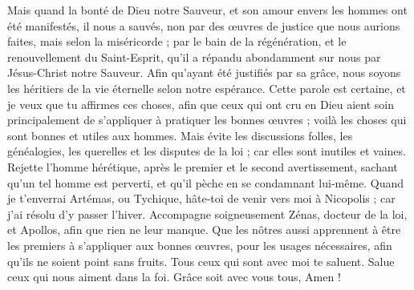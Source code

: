 \begin{multicols}{2}
Mais quand la bonté de Dieu notre Sauveur, et son amour envers les hommes ont été manifestés, il nous a sauvés,
non par des œuvres de justice que nous aurions faites, mais selon la miséricorde ; par le bain de la régénération, et le renouvellement du Saint-Esprit,
qu’il a répandu abondamment sur nous par Jésus-Christ notre Sauveur.
Afin qu'ayant été justifiés par sa grâce, nous soyons les héritiers de la vie éternelle selon notre espérance.
Cette parole est certaine, et je veux que tu affirmes ces choses, afin que ceux qui ont cru en Dieu aient soin principalement de s'appliquer à pratiquer les bonnes œuvres ; voilà les choses qui sont bonnes et utiles aux hommes.
Mais évite les discussions folles, les généalogies, les querelles et les disputes de la loi ; car elles sont inutiles et vaines.
Rejette l'homme hérétique, après le premier et le second avertissement,
sachant qu'un tel homme est perverti, et qu'il pèche en se condamnant lui-même.
Quand je t’enverrai Artémas, ou Tychique, hâte-toi de venir vers moi à Nicopolis ; car j'ai résolu d'y passer l'hiver.
Accompagne soigneusement Zénas, docteur de la loi, et Apollos, afin que rien ne leur manque.
Que les nôtres aussi apprennent à être les premiers à s'appliquer aux bonnes œuvres, pour les usages nécessaires, afin qu'ils ne soient point sans fruits.
Tous ceux qui sont avec moi te saluent. Salue ceux qui nous aiment dans la foi. Grâce soit avec vous tous, Amen !
\PPE{}
\end{multicols}
